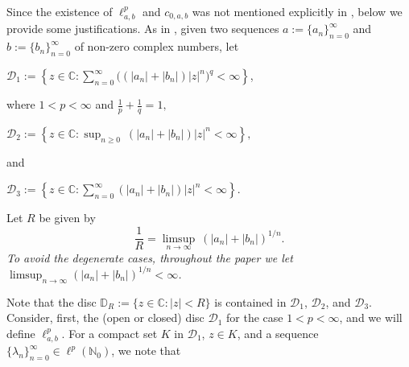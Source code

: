 \documentclass[12pt, reqno]{amsart}
\theoremstyle{definition}
\theoremstyle{remark}
\numberwithin{equation}{section}
\begin{document}
Since the existence of $\ell^p_{a,b}$ and $c_{0,a,b}$ was not mentioned explicitly in \cite{Das-Mundayadan}, below we provide some justifications. As in \cite{Das-Mundayadan}, given two sequences $a:=\{a_n\}_{n=0}^{\infty}$ and $b:=\{b_n\}_{n=0}^{\infty}$ of non-zero complex numbers, let 
\begin{center}
    $\mathcal{D}_{1}:=\left\{ z \in \mathbb{C}:\sum_{n=0}^{\infty} \big(( \lvert a_{n}\rvert+\lvert b_{n}\rvert)\lvert z \rvert^{n} \big)^{q}<\infty\right\}$,
    \end{center}
    where $1<p<\infty$ and $\frac{1}{p}+\frac{1}{q}=1,$
     \begin{center}
    $\mathcal{D}_{2}:=\left\{ z \in \mathbb{C}:\sup_{n\geq 0} ~(\lvert a_{n}\rvert+\lvert b_{n}\rvert)\lvert z\rvert^{n}<\infty\right\},$
    \end{center}
    and
    \begin{center}
    $\mathcal{D}_{3}:=\left\{ z \in \mathbb{C}:\sum_{n=0}^{\infty} ( \lvert a_{n}\rvert+\lvert b_{n}\rvert)\lvert z \rvert^{n} <\infty\right\}.$
    \end{center}
Let $R$ be given by
\[
\frac{1}{R}=\limsup_{n\rightarrow \infty} ~(|a_n|+|b_n|)^{1/n}.
\]
\textit{To avoid the degenerate cases, throughout the paper we let $\limsup_{n\rightarrow \infty}(|a_n|+|b_n|)^{1/n}<\infty$.}

Note that the disc $\mathbb{D}_R:=\{z\in \mathbb{C}:|z|<R\}$ is contained in $\mathcal{D}_1$, $\mathcal{D}_2$, and $\mathcal{D}_3$. Consider, first, the (open or closed) disc $\mathcal{D}_1$ for the case $1<p<\infty$, and we will define $\ell^p_{a,b}$. For a compact set $K$ in $\mathcal{D}_1$, $z \in K$, and a sequence $\{\lambda_n\}_{n=0}^{\infty}\in \ell^p(\mathbb{N}_{0})$, we note that
\end{document}
